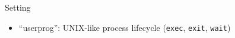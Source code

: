 \documentclass[xcolor=dvipsnames]{beamer}
\begin{document}
\begin{frame}{Setting}
\begin{itemize}
\begin{itemize}
			\item ``userprog'': UNIX-like process lifecycle
				({\tt exec}, %
				{\tt exit}, {\tt wait})
		\end{itemize}
	\end{itemize}
\end{frame}
\end{document}
